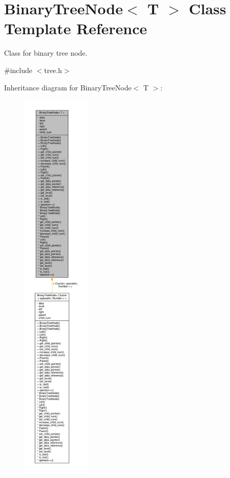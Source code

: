 \hypertarget{classBinaryTreeNode}{}\section{Binary\+Tree\+Node$<$ T $>$ Class Template Reference}
\label{classBinaryTreeNode}


Class for binary tree node.  




{\ttfamily \#include $<$tree.\+h$>$}



Inheritance diagram for Binary\+Tree\+Node$<$ T $>$\+:\nopagebreak
\begin{figure}[H]
\begin{center}
\leavevmode
\includegraphics[height=550pt]{classBinaryTreeNode__inherit__graph}
\end{center}
\end{figure}


